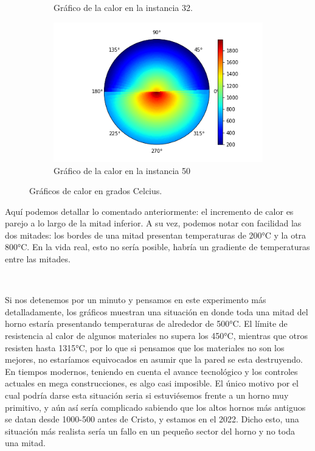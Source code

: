 \begin{figure}[H]
\begin{subfigure}{0.24\linewidth}
        \caption{Gráfico de la calor en la instancia 32.}
        \label{fig:D3_40_80_31_calor}
    \end{subfigure}
    \hfill
    \begin{subfigure}{0.24\linewidth}
        \centering
        \includegraphics[scale=0.24]{img/EXP3/D3_40_80_49_calor}
        \caption{Gráfico de la calor en la instancia 50}
        \label{fig:D3_40_80_49_calor}
    \end{subfigure}
    \caption{Gráficos de calor en grados Celcius.}
    \label{fig:D3_calor}
\end{figure}

Aquí podemos detallar lo comentado anteriormente: el incremento de calor es parejo a lo largo de la mitad inferior. A su vez, podemos notar con facilidad las dos mitades: los bordes de una mitad  presentan temperaturas de 200°C y la otra 800°C. En la vida real, esto no sería posible, habría un gradiente de temperaturas entre las mitades. 

\

Si nos detenemos por un minuto y pensamos en este experimento más detalladamente, los gráficos muestran una situación en donde toda una mitad del horno estaría presentando temperaturas de alrededor de 500°C. El límite de resistencia al calor de algunos materiales no supera los 450°C, mientras que otros resisten hasta 1315°C, por lo que si pensamos que los materiales no son los mejores, no estaríamos equivocados en asumir que la pared se esta destruyendo. En tiempos modernos, teniendo en cuenta el avance tecnológico y los controles actuales en mega construcciones, es algo casi imposible. El único motivo por el cual podría darse esta situación seria si estuviésemos frente a un horno muy primitivo, y aún así sería complicado sabiendo que los altos hornos más antiguos se datan desde 1000-500 antes de Cristo, y estamos en el 2022. Dicho esto, una situación más realista sería un fallo en un pequeño sector del horno y no toda una mitad.

